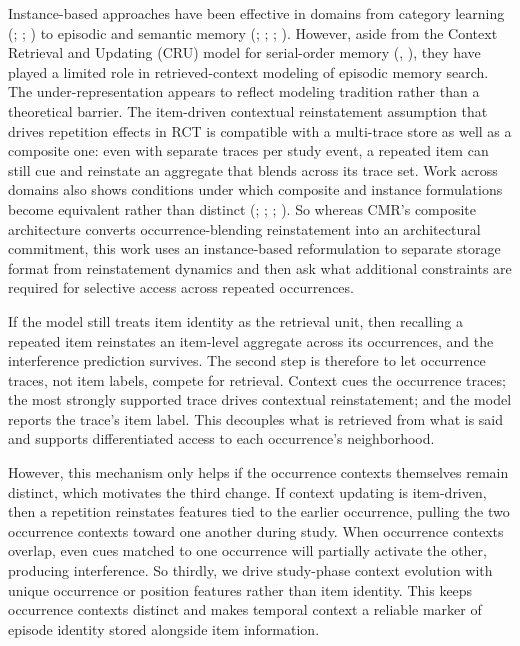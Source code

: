\documentclass[
  man,
  floatsintext,
  longtable,
  nolmodern,
  notxfonts,
  notimes,
  draftfirst,
  colorlinks=true,linkcolor=blue,citecolor=blue,urlcolor=blue]{apa7}
\begin{document}
Instance-based approaches have been effective in domains from category
learning (;
;
) to episodic and semantic
memory (;
;
;
). However,
aside from the Context Retrieval and Updating (CRU) model for
serial-order memory (,
), they have played a limited role
in retrieved-context modeling of episodic memory search. The
under-representation appears to reflect modeling tradition rather than a
theoretical barrier. The item-driven contextual reinstatement assumption
that drives repetition effects in RCT is compatible with a multi-trace
store as well as a composite one: even with separate traces per study
event, a repeated item can still cue and reinstate an aggregate that
blends across its trace set. Work across domains also shows conditions
under which composite and instance formulations become equivalent rather
than distinct (;
;
;
). So whereas CMR's
composite architecture converts occurrence-blending reinstatement into
an architectural commitment, this work uses an instance-based
reformulation to separate storage format from reinstatement dynamics and
then ask what additional constraints are required for selective access
across repeated occurrences.

If the model still treats item identity as the retrieval unit, then
recalling a repeated item reinstates an item-level aggregate across its
occurrences, and the interference prediction survives. The second step
is therefore to let occurrence traces, not item labels, compete for
retrieval. Context cues the occurrence traces; the most strongly
supported trace drives contextual reinstatement; and the model reports
the trace's item label. This decouples what is retrieved from what is
said and supports differentiated access to each occurrence's
neighborhood.

However, this mechanism only helps if the occurrence contexts themselves
remain distinct, which motivates the third change. If context updating
is item-driven, then a repetition reinstates features tied to the
earlier occurrence, pulling the two occurrence contexts toward one
another during study. When occurrence contexts overlap, even cues
matched to one occurrence will partially activate the other, producing
interference. So thirdly, we drive study-phase context evolution with
unique occurrence or position features rather than item identity. This
keeps occurrence contexts distinct and makes temporal context a reliable
marker of episode identity stored alongside item information.
\end{document}
